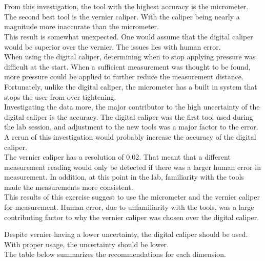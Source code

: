 \section{}
\noindent From this investigation, the tool with the highest accuracy is the micrometer. The second best tool is the vernier caliper. With the caliper being nearly a magnitude more inaccurate than the micrometer. \\

\noindent This result is somewhat unexpected. One would assume that the digital caliper would be superior over the vernier. The issues lies with human error.\\

\noindent When using the digital caliper, determining when to stop applying pressure was difficult at the start. When a sufficient measurement was thought to be found, more pressure could be applied to further reduce the measurement distance. Fortunately, unlike the digital caliper, the micrometer has a built in system that stops the user from over tightening. \\

\noindent Investigating the data more, the major contributor to the high uncertainty of the digital caliper is the accuracy. The digital caliper was the first tool used during the lab session, and adjustment to the new tools was a major factor to the error. A rerun of this investigation would probably increase the accuracy of the digital caliper.\\

\noindent The vernier caliper has a resolution of 0.02. That meant that a different measurement reading would only be detected if there was a larger human error in measurement. In addition, at this point in the lab, familiarity with the tools made the measurements more consistent.\\

\noindent This results of this exercise suggest to use the micrometer and the vernier caliper for measurement. Human error, due to unfamiliarity with the tools, was a large contributing factor to why the vernier caliper was chosen over the digital caliper. 

\noindent Despite vernier having a lower uncertainty, the digital caliper should be used. With proper usage, the uncertainty should be lower. \\

\noindent The table below summarizes the recommendations for each dimension. 

